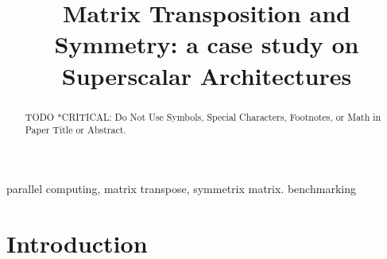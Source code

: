 \documentclass[conference]{IEEEtran}
\begin{document}
\title{Matrix Transposition and Symmetry: a case study on Superscalar Architectures\\
}

\author{
}

\maketitle


\begin{abstract}
TODO *CRITICAL: Do Not Use Symbols, Special Characters, Footnotes, 
or Math in Paper Title or Abstract.
\end{abstract}

\begin{IEEEkeywords}
parallel computing, matrix transpose, symmetrix matrix. benchmarking
\end{IEEEkeywords}

\section{Introduction}
\end{document}
